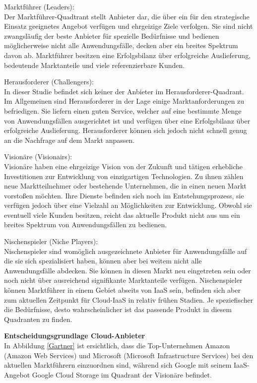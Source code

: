 \documentclass[12pt,a4paper,bibliography=totocnumbered,listof=totocnumbered]{scrartcl}
\begin{document}
\begin{compactitem}
\item{Marktführer (Leaders):}
\\Der Marktführer-Quadtrant stellt Anbieter dar, die über ein für den strategische Einsatz geeignetes Angebot verfügen und ehrgeizige Ziele verfolgen. Sie sind nicht zwangsläufig der beste Anbieter für spezielle Bedürfnisse und bedienen möglicherweise nicht alle Anwendungsfälle, decken aber ein breites Spektrum davon ab. Marktführer besitzen eine Erfolgsbilanz über erfolgreiche Auslieferung, bedeutende Marktanteile und viele referenzierbare Kunden.
\item{Herausforderer (Challengers):}
\\In dieser Studie befindet sich keiner der Anbieter im Herausforderer-Quadrant. Im Allgemeinen sind Herausforderer in der Lage einige Marktanforderungen zu befriedigen. Sie liefern einen guten Service, welcher auf eine bestimmte Menge von Anwendungsfällen ausgerichtet ist und verfügen über eine Erfolgsbilanz über erfolgreiche Auslieferung. Herausforderer können sich jedoch nicht schnell genug an die Nachfrage auf dem Markt anpassen.
\item{Visionäre (Visionairs):}
\\Visionäre haben eine ehrgeizige Vision von der Zukunft und tätigen erhebliche Investitionen zur Entwicklung von einzigartigen Technologien. Zu ihnen zählen neue Marktteilnehmer oder bestehende Unternehmen, die in einen neuen Markt vorstoßen möchten. Ihre Dienste befinden sich noch im Entstehungsprozess, sie verfügen jedoch über eine Vielzahl an Möglichkeiten zur Entwicklung. Obwohl sie eventuell viele Kunden besitzen, reicht das aktuelle Produkt nicht aus um ein breites Spektrum von Anwendungsfällen zu bedienen.
\item{Nischenspieler (Niche Players):}
\\Nischenspieler sind womöglich ausgezeichnete Anbieter für Anwendungsfälle auf die sie sich spezialisiert haben, können aber bei weitem nicht alle Anwendungsfälle abdecken. Sie können in diesen Markt neu eingetreten sein oder noch nicht über ausreichend signifikante Marktanteile verfügen. Nischenspieler können Marktführer in einem Gebiet abseits von IaaS sein, befinden sich aber zum aktuellen Zeitpunkt für Cloud-IaaS in relativ frühen Stadien. Je speziefischer die Bedürfnisse, desto wahrscheinlicher ist das passende Produkt in diesem Quadranten zu finden.
\end{compactitem}

\textbf{Entscheidungsgrundlage Cloud-Anbieter}\\
In Abbildung \ref{Gartner} ist ersichtlich, dass die Top-Unternehmen Amazon (Amazon Web Services) und Microsoft (Microsoft Infrastructure Services) bei den aktuellen Marktführern einzuordnen sind, während sich Google mit seinem IaaS-Angebot Google Cloud Storage im Quadrant der Visionäre befindet.
\end{document}
